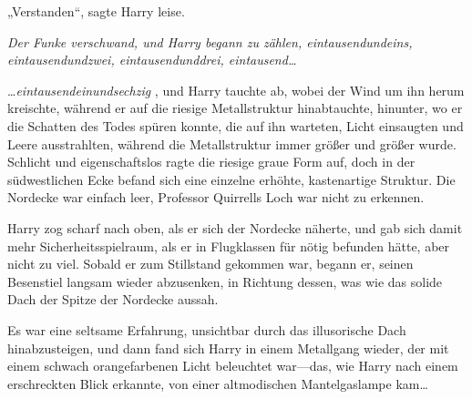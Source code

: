 „Verstanden“, sagte Harry leise.

\emph{Der Funke verschwand, und Harry begann zu zählen, \emph{eintausendundeins, eintausendundzwei, eintausendunddrei, eintausend…}}

…\emph{eintausendeinundsechzig} , und Harry tauchte ab, wobei der Wind um ihn herum kreischte, während er auf die riesige Metallstruktur hinabtauchte, hinunter, wo er die Schatten des Todes spüren konnte, die auf ihn warteten, Licht einsaugten und Leere ausstrahlten, während die Metallstruktur immer größer und größer wurde. Schlicht und eigenschaftslos ragte die riesige graue Form auf, doch in der südwestlichen Ecke befand sich eine einzelne erhöhte, kastenartige Struktur. Die Nordecke war einfach leer, Professor Quirrells Loch war nicht zu erkennen.

Harry zog scharf nach oben, als er sich der Nordecke näherte, und gab sich damit mehr Sicherheitsspielraum, als er in Flugklassen für nötig befunden hätte, aber nicht zu viel. Sobald er zum Stillstand gekommen war, begann er, seinen Besenstiel langsam wieder abzusenken, in Richtung dessen, was wie das solide Dach der Spitze der Nordecke aussah.

Es war eine seltsame Erfahrung, unsichtbar durch das illusorische Dach hinabzusteigen, und dann fand sich Harry in einem Metallgang wieder, der mit einem schwach orangefarbenen Licht beleuchtet war—das, wie Harry nach einem erschreckten Blick erkannte, von einer altmodischen Mantelgaslampe kam…

